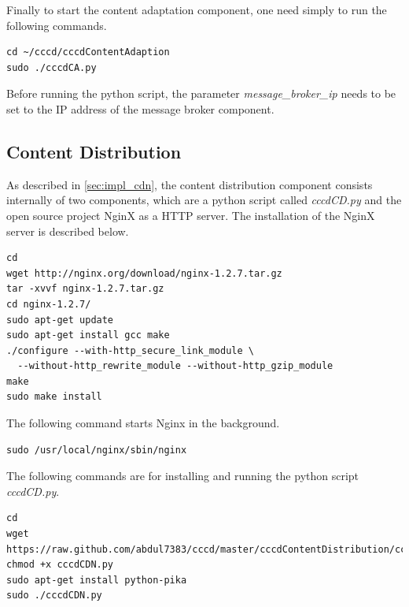 Finally to start the content adaptation component, one need simply to run the following commands.

\begin{code}
\begin{verbatim}
cd ~/cccd/cccdContentAdaption
sudo ./cccdCA.py
\end{verbatim}
\end{code}

Before running the python script, the parameter \textit{message\_broker\_ip} needs to be set to the IP address of the message broker component.

\subsection{Content Distribution\label{sec:eval_te_cd}}
As described in \ref{sec:impl_cdn}, the content distribution component consists internally of two components, which are a python script called \textit{cccdCD.py} and the open source project NginX as a \ac{HTTP} server. The installation of the NginX server is described below.

\begin{code}
\begin{verbatim}
cd
wget http://nginx.org/download/nginx-1.2.7.tar.gz
tar -xvvf nginx-1.2.7.tar.gz 
cd nginx-1.2.7/
sudo apt-get update
sudo apt-get install gcc make
./configure --with-http_secure_link_module \
  --without-http_rewrite_module --without-http_gzip_module
make
sudo make install
\end{verbatim}
\end{code}

The following command starts Nginx in the background.

\begin{code}
\begin{verbatim}
sudo /usr/local/nginx/sbin/nginx
\end{verbatim}
\end{code}

The following commands are for installing and running the python script \textit{cccdCD.py}.

\begin{code}
\begin{verbatim}
cd
wget https://raw.github.com/abdul7383/cccd/master/cccdContentDistribution/cccdCDN.py
chmod +x cccdCDN.py
sudo apt-get install python-pika
sudo ./cccdCDN.py
\end{verbatim}
\end{code}

